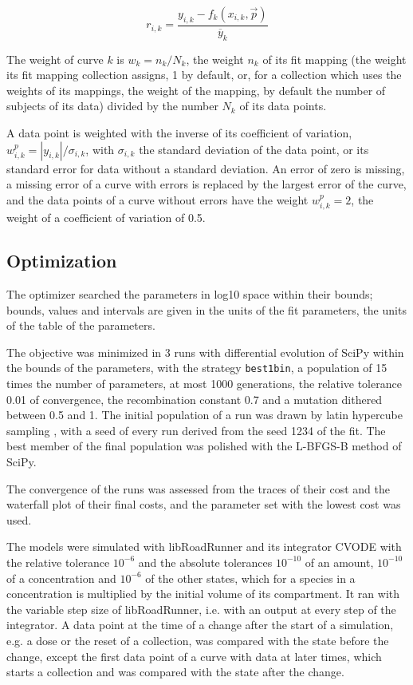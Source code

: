 \documentclass{article}
\begin{document}
\begin{equation}
r_{i,k} = \frac{y_{i,k} - f_k(x_{i,k}, \vec{p})}{\overline{y}_k}
\end{equation}

The weight of curve $k$ is $w_k = n_k / N_k$, the weight $n_k$ of its fit mapping (the weight its fit mapping collection assigns, 1 by default, or, for a collection which uses the weights of its mappings, the weight of the mapping, by default the number of subjects of its data) divided by the number $N_k$ of its data points.

A data point is weighted with the inverse of its coefficient of variation, $w^{p}_{i,k} = |y_{i,k}| / \sigma_{i,k}$, with $\sigma_{i,k}$ the standard deviation of the data point, or its standard error for data without a standard deviation. An error of zero is missing, a missing error of a curve with errors is replaced by the largest error of the curve, and the data points of a curve without errors have the weight $w^{p}_{i,k} = 2$, the weight of a coefficient of variation of 0.5.

\subsection{Optimization}

The optimizer searched the parameters in log10 space within their bounds; bounds, values and intervals are given in the units of the fit parameters, the units of the table of the parameters.

The objective was minimized in 3 runs with differential evolution \cite{Storn1997} of SciPy \cite{Virtanen2020} within the bounds of the parameters, with the strategy \texttt{best1bin}, a population of 15 times the number of parameters, at most 1000 generations, the relative tolerance 0.01 of convergence, the recombination constant 0.7 and a mutation dithered between 0.5 and 1. The initial population of a run was drawn by latin hypercube sampling \cite{McKay1979}, with a seed of every run derived from the seed 1234 of the fit. The best member of the final population was polished with the L-BFGS-B method of SciPy.

The convergence of the runs was assessed from the traces of their cost and the waterfall plot of their final costs, and the parameter set with the lowest cost was used.

The models were simulated with libRoadRunner \cite{Welsh2023} and its integrator CVODE \cite{Hindmarsh2005} with the relative tolerance $10^{-6}$ and the absolute tolerances $10^{-10}$ of an amount, $10^{-10}$ of a concentration and $10^{-6}$ of the other states, which for a species in a concentration is multiplied by the initial volume of its compartment. It ran with the variable step size of libRoadRunner, i.e. with an output at every step of the integrator. A data point at the time of a change after the start of a simulation, e.g. a dose or the reset of a collection, was compared with the state before the change, except the first data point of a curve with data at later times, which starts a collection and was compared with the state after the change.
\end{document}
